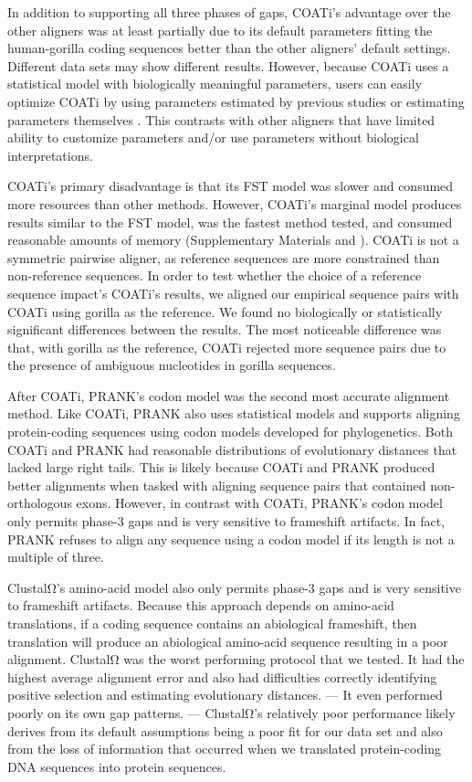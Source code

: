 \documentclass[12pt,letterpaper]{article}
\begin{document}
In addition to supporting all three phases of gaps, COATi's advantage over the other aligners was at least partially due to its default parameters fitting the human-gorilla coding sequences better than the other aligners' default settings. Different data sets may show different results. However, because COATi uses a statistical model with biologically meaningful parameters, users can easily optimize COATi by using parameters estimated by previous studies or estimating parameters themselves \citep[e.g.][]{zhu2022profiling}. This contrasts with other aligners that have limited ability to customize parameters and/or use parameters without biological interpretations.

COATi's primary disadvantage is that its FST model was slower and consumed more resources than other methods. However, COATi's marginal model produces results similar to the FST model, was the fastest method tested, and consumed reasonable amounts of memory (Supplementary Materials and \citealt{garcia2023dissertation}).
%
COATi is not a symmetric pairwise aligner, as reference sequences are more constrained than non-reference sequences. In order to test whether the choice of a reference sequence impact's COATi's results, we aligned our empirical sequence pairs with COATi using gorilla as the reference. We found no biologically or statistically significant differences between the results. The most noticeable difference was that, with gorilla as the reference, COATi rejected more sequence pairs due to the presence of ambiguous nucleotides in gorilla sequences.

After COATi, PRANK's codon model was the second most accurate alignment method. Like COATi, PRANK also uses statistical models and supports aligning protein-coding sequences using codon models developed for phylogenetics. Both COATi and PRANK had reasonable distributions of evolutionary distances that lacked large right tails. This is likely because COATi and PRANK produced better alignments when tasked with aligning sequence pairs that contained non-orthologous exons. However, in contrast with COATi, PRANK's codon model only permits phase-3 gaps and is very sensitive to frameshift artifacts. In fact, PRANK refuses to align any sequence using a codon model if its length is not a multiple of three.

ClustalΩ's amino-acid model also only permits phase-3 gaps and is very sensitive to frameshift artifacts. Because this approach depends on amino-acid translations, if a coding sequence contains an abiological frameshift, then translation will produce an abiological amino-acid sequence resulting in a poor alignment. ClustalΩ was the worst performing protocol that we tested. It had the highest average alignment error and also had difficulties correctly identifying positive selection and estimating evolutionary distances.  --- It even performed poorly on its own gap patterns. --- ClustalΩ's relatively poor performance likely derives from its default assumptions being a poor fit for our data set and also from the loss of information that occurred when we translated protein-coding DNA sequences into protein sequences.
\end{document}
